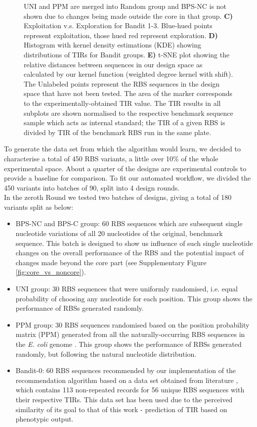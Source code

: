 \documentclass{scrartcl}[2013/05/29]%
\newcommand{\mengyan}[1]{\textcolor{magenta}{#1}}
\begin{document}
\begin{figure}[!ht]
{    UNI and PPM are merged into Random group and BPS-NC is not shown due to changes being made outside the core in that group.
    \textbf{C)} Exploitation v.s. Exploration for Bandit 1-3. Blue-hued points represent exploitation, those hued red represent exploration.
    \textbf{D)} Histogram with kernel density estimations (KDE) showing distributions of TIRs for Bandit groups.
    \textbf{E)} t-SNE plot showing the relative distances between sequences in our design space as calculated by our kernel function (weighted degree kernel with shift).
    The Unlabeled points represent the RBS sequences in the design space that have not been tested.
    The area of the marker corresponds to the experimentally-obtained TIR value.
    The TIR results in all subplots are shown normalised to the respective benchmark sequence sample which acts as internal standard; the TIR of a given RBS is divided by TIR of the benchmark RBS run in the same plate. }
    \label{fig: Swarmplot and Quantplot}
\end{figure}

To generate the data set from which the algorithm would learn, we decided to characterise a total of 450 RBS variants, a little over 10\% of the whole experimental space. 
About a quarter of the designs are experimental controls to provide a baseline for comparison.
To fit our automated workflow, we divided the 450 variants into batches of 90, split into 4 design rounds.\\

In the zeroth Round we tested two batches of designs, giving a total of 180 variants split as below:

\begin{itemize}
    \item BPS-NC and BPS-C group: 60 RBS sequences which are subsequent single nucleotide variations of all 20 nucleotides of the original, benchmark sequence. This batch is designed to show us influence of such single nucleotide changes on the overall performance of the RBS and the potential impact of changes made beyond the core part (see Supplementary Figure \ref{fig:core_vs_noncore}).
    \item UNI group: 30 RBS sequences that were uniformly randomised, i.e. equal probability of choosing any nucleotide for each position. This group shows the performance of RBSs generated randomly.
    \item PPM group: 30 RBS sequences randomised based on the position probability matrix (PPM) generated from all the naturally-occurring RBS sequences in  the \emph{E. coli} genome \cite{barrick1994quantitative}. This group shows the performance of RBSs generated randomly, but following the natural nucleotide distribution.
    \item Bandit-0: 60 RBS sequences recommended by our implementation of the recommendation algorithm based on a data set obtained from literature \cite{jervis2018machine}, which contains 113 non-repeated records for 56 unique RBS sequences with their respective TIRs.
    This data set has been used due to the perceived similarity of its goal to that of this work - prediction of TIR based on phenotypic output.
\end{itemize}
\end{document}
